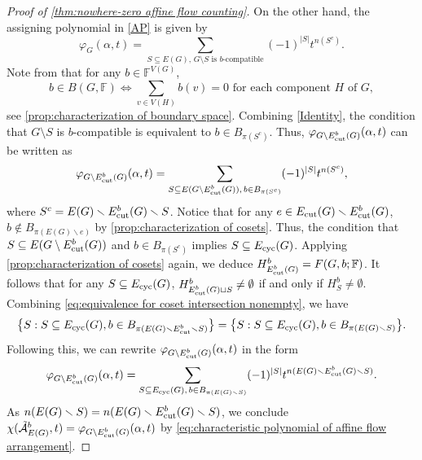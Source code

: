 \documentclass[12pt]{article}%
\renewcommand*{\bm}[1]{#1}%
\numberwithin{equation}{section}
\begin{document}
\begin{proof}[Proof of \autoref{thm:nowhere-zero affine flow counting}]
On the other hand, the assigning polynomial in \eqref{AP} is given by
\[
\varphi_G(\alpha,t)=\sum_{S\subseteq E(G),\,G\setminus S\text{ is $\bm b$-compatible}}(-1)^{|S|}t^{n(S^c)}.
\]
Note from \cite[Proposition 2.1]{Jaeger1992} that for any $\bm b\in \mathbb{F}^{V(G)}$, 
\begin{equation}\label{CBS}
\bm b\in B(G,\mathbb{F})\iff \sum_{v\in V(H)}\bm b(v)=0 \text{ for each component $H$ of $G$},
\end{equation} 
see \autoref{prop:characterization of boundary space}. Combining \eqref{Identity}, the condition that $G\setminus S$ is $\bm b$-compatible is equivalent to $\bm b\in B_{\pi(S^c)}$. Thus, $\varphi_{G\setminus E_{\rm cut}^{\bm b}(G)}(\alpha,t)$ can be written as
\[
\varphi_{G\setminus E_{\rm cut}^{\bm b}(G)}(\alpha,t)=\sum_{S\subseteq E(G\setminus E_{\rm cut}^{\bm b}(G)),\,\bm b\in B_{\pi(S^c)}}(-1)^{|S|}t^{n(S^c)},
\]
where $S^c=E(G)\smallsetminus E_{\rm cut}^{\bm b}(G)\smallsetminus S$.
Notice that for any $e\in E_{\rm cut}(G)\smallsetminus E_{\rm cut}^{\bm b}(G)$, $\bm b\notin B_{\pi(E(G)\smallsetminus e)}$ by  \autoref{prop:characterization of cosets}. Thus, the condition that $S\subseteq E(G\setminus E_{\rm cut}^{\bm b}(G))$ and $\bm b\in B_{\pi(S^c)}$ implies 
$S\subseteq E_{\rm cyc}(G)$. Applying \autoref{prop:characterization of cosets} again, we deduce $H_{E_{\rm cut}^{\bm b}(G)}^{\bm b}=F(G,\bm b;\mathbb{F})$. It follows that for any $S\subseteq E_{\rm cyc}(G)$, $H_{E_{\rm cut}^{\bm b}(G)\sqcup S}^{\bm b}\ne\emptyset$ if and only if $H_S^{\bm b}\ne\emptyset$.  Combining \eqref{eq:equivalence for coset intersection nonempty}, we have 
\[
\big\{S: S\subseteq E_{\rm cyc}(G), \bm b\in B_{\pi(E(G)\smallsetminus E_{\rm cut}^{\bm b}\smallsetminus S)}\big\}=\big\{S: S\subseteq E_{\rm cyc}(G), \bm b\in B_{\pi(E(G)\smallsetminus S)}\big\}.
\]
Following this,  we can rewrite $\varphi_{G\setminus E_{\rm cut}^{\bm b}(G)}(\alpha,t)$ in the form
\[
\varphi_{G\setminus E_{\rm cut}^{\bm b}(G)}(\alpha,t)=\sum_{S\subseteq E_{\rm cyc}(G),\,\bm b\in B_{\pi(E(G)\smallsetminus S)}}(-1)^{|S|}t^{n(E(G)\smallsetminus E_{\rm cut}^{\bm b}(G)\smallsetminus S)}.
\]
As $n(E(G)\smallsetminus S)=n(E(G)\smallsetminus E_{\rm cut}^{\bm b}(G)\smallsetminus S)$, we conclude $\chi(\tilde{\mathcal{A}}_{E(G)}^{\bm b},t)=\varphi_{G\setminus E_{\rm cut}^{\bm b}(G)}(\alpha,t)$ by \eqref{eq:characteristic polynomial of affine flow arrangement}. 


\end{proof}
\end{document}
